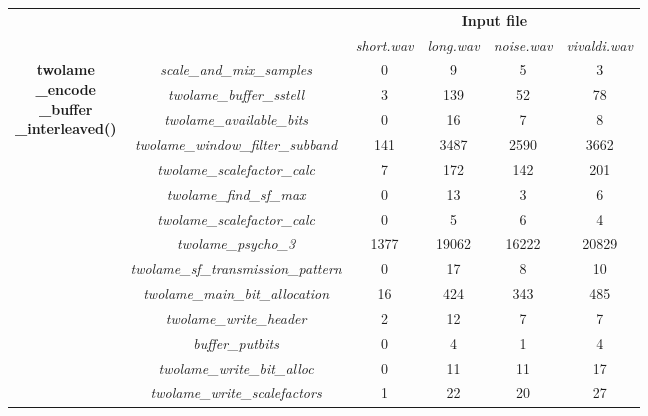 \begin{table}[H]
    \centering
    \begin{tabular}{|c|c|c|c|c|c|}
    \cline{3-6}
    \multicolumn{2}{c|}{}  & \multicolumn{4}{c|}{\textbf{Input file}} \\
    \cline{3-6}
    \multicolumn{2}{c|}{} & \textit{short.wav} & \textit{long.wav} & \textit{noise.wav} & \textit{vivaldi.wav} \\
    \cline{1-6}
   \multirow{23}{*}{\parbox{2.5cm}{\centering \textbf{twolame} \\ \textbf{\_encode} \\ \textbf{\_buffer} \\ \textbf{\_interleaved()}}}  & \multicolumn{1}{c|}{\textit{scale\_and\_mix\_samples}}  & 0 & 9 & 5 & 3 \\ 
    \cline{2-6}
    & \multicolumn{1}{c|}{\textit{twolame\_buffer\_sstell}} & 3 & 139 & 52 & 78 \\ 
    \cline{2-6}
    & \multicolumn{1}{c|}{\textit{twolame\_available\_bits}} & 0 & 16 & 7 & 8  \\ 
    \cline{2-6}
    & \multicolumn{1}{c|}{\textit{twolame\_window\_filter\_subband}} & 141  & 3487 & 2590 & 3662  \\ 
    \cline{2-6}
    & \multicolumn{1}{c|}{\textit{twolame\_scalefactor\_calc}} & 7 & 172 & 142 &  201  \\ 
    \cline{2-6}
    & \multicolumn{1}{c|}{\textit{twolame\_find\_sf\_max}} & 0  & 13 & 3 & 6   \\ 
    \cline{2-6}
    & \multicolumn{1}{c|}{\textit{twolame\_scalefactor\_calc}} & 0  & 5 & 6 & 4  \\ 
    \cline{2-6}
     & \multicolumn{1}{c|}{\textit{twolame\_psycho\_3}} & 1377  & 19062 & 16222 &  20829 \\ 
    \cline{2-6}
    & \multicolumn{1}{c|}{\textit{twolame\_sf\_transmission\_pattern}} & 0 & 17 & 8 &  10 \\ 
    \cline{2-6}
    & \multicolumn{1}{c|}{\textit{twolame\_main\_bit\_allocation}} & 16  & 424 & 343 & 485  \\ 
    \cline{2-6}
    & \multicolumn{1}{c|}{\textit{twolame\_write\_header}} & 2 & 12 & 7 &  7 \\
    \cline{2-6}
    & \multicolumn{1}{c|}{\textit{buffer\_putbits}} & 0 & 4 & 1 & 4  \\
    \cline{2-6}
    & \multicolumn{1}{c|}{\textit{twolame\_write\_bit\_alloc}} & 0 & 11 & 11 &  17 \\
    \cline{2-6}
    & \multicolumn{1}{c|}{\textit{twolame\_write\_scalefactors}} & 1 & 22 & 20 & 27 \\

\end{tabular}
\end{table}
